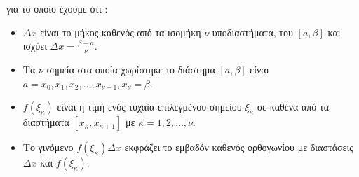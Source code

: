\documentclass[twoside,nofonts]{article}
\begin{document}
για το οποίο έχουμε ότι :
\begin{itemize}[itemsep=0mm]
\item $ \varDelta x $ είναι το μήκος καθενός από τα ισομήκη $ \nu $ υποδιαστήματα, του $ [a,\beta] $ και ισχύει $ \varDelta x=\frac{\beta-a}{\nu} $.
\item Τα $ \nu $ σημεία στα οποία χωρίστηκε το διάστημα $ [a,\beta] $ είναι $ a=x_0, x_1,x_2,\ldots,x_{\nu-1}, x_\nu=\beta $.
\item $ f(\xi_\kappa) $ είναι η τιμή ενός τυχαία επιλεγμένου σημείου $ \xi_\kappa $ σε καθένα από τα διαστήματα $ \left[x_\kappa,x_{\kappa+1} \right] $ με $ \kappa=1,2,\ldots,\nu $.
\item Το γινόμενο $ f(\xi_\kappa)\varDelta x $ εκφράζει το εμβαδόν καθενός ορθογωνίου με διαστάσεις $ \varDelta x $ και $ f(\xi_\kappa) $.
\begin{center}
\end{center}
\end{itemize}
\end{document}
